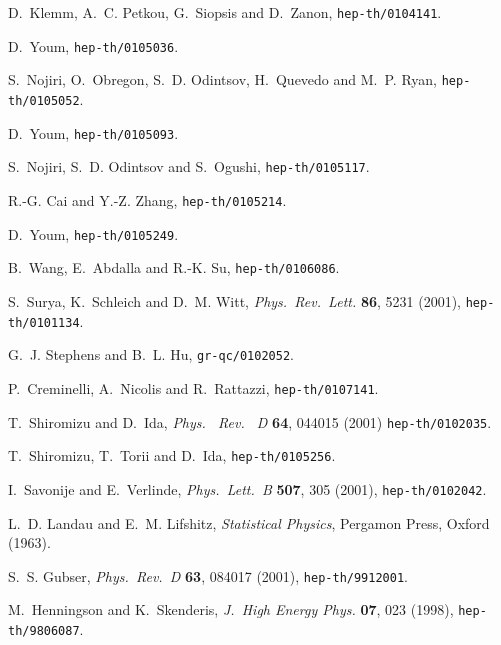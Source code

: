 \documentclass[a4paper,12pt]{article}
\begin{document}
\begin{thebibliography}{10}
D.~Klemm, A.~C. Petkou, G.~Siopsis and D.~Zanon, \texttt{hep-th/0104141}.

D.~Youm, \texttt{hep-th/0105036}.

S.~Nojiri, O.~Obregon, S.~D. Odintsov, H.~Quevedo and M.~P. Ryan,
  \texttt{hep-th/0105052}.

D.~Youm, \texttt{hep-th/0105093}.

S.~Nojiri, S.~D. Odintsov and S.~Ogushi, \texttt{hep-th/0105117}.

R.-G. Cai and Y.-Z. Zhang, \texttt{hep-th/0105214}.

D.~Youm, \texttt{hep-th/0105249}.

B.~Wang, E.~Abdalla and R.-K. Su, \texttt{hep-th/0106086}.

S.~Surya, K.~Schleich and D.~M. Witt, \emph{Phys.~Rev.~Lett.} \textbf{86}, 5231
  (2001), \texttt{hep-th/0101134}.

G.~J. Stephens and B.~L. Hu, \texttt{gr-qc/0102052}.

P.~Creminelli, A.~Nicolis and R.~Rattazzi, \texttt{hep-th/0107141}.

T.~Shiromizu and D.~Ida, \emph{Phys.~ Rev. ~D} \textbf{64}, 044015 (2001)
\texttt{hep-th/0102035}.

T.~Shiromizu, T.~Torii and D.~Ida,
\texttt{hep-th/0105256}.


I.~Savonije and E.~Verlinde, \emph{Phys.~Lett.~B} \textbf{507}, 305 (2001),
  \texttt{hep-th/0102042}.

L.~D. Landau and E.~M. Lifshitz, \emph{Statistical Physics}, Pergamon Press,
  Oxford (1963).

S.~S. Gubser, \emph{Phys.~Rev.~D} \textbf{63}, 084017 (2001),
  \texttt{hep-th/9912001}.

M.~Henningson and K.~Skenderis, \emph{J.~High Energy Phys.} \textbf{07}, 023
  (1998), \texttt{hep-th/9806087}.

\end{thebibliography}
\end{document}
